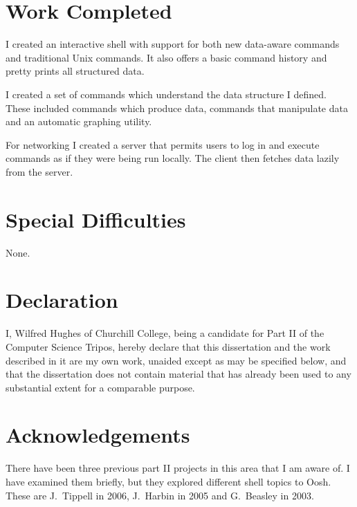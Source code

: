 \documentclass[12pt,twoside,notitlepage]{report}
\begin{document}
\section*{Work Completed}
I created an interactive shell with support for both new data-aware commands and
traditional Unix commands. It also offers a basic command history and pretty
prints all structured data.

I created a set of commands which understand the data structure I defined. These
included commands which produce data, commands that manipulate data and an
automatic graphing utility.

For networking I created a server that permits users to log in and execute
commands as if they were being run locally. The client then fetches data lazily
from the server.

\section*{Special Difficulties}
None.
 
\newpage
\section*{Declaration}

I, Wilfred Hughes of Churchill College, being a candidate for Part II
of the Computer Science Tripos, hereby declare that this dissertation
and the work described in it are my own work, unaided except as may be
specified below, and that the dissertation does not contain material
that has already been used to any substantial extent for a comparable
purpose.

\bigskip
{}

\medskip
{}

\cleardoublepage

\tableofcontents

\listoffigures

\newpage
\section*{Acknowledgements}

There have been three previous part II projects in this area that I am
aware of. I have examined them briefly, but they explored different
shell topics to Oosh. These are J.\ Tippell in 2006, J.\ Harbin in
2005 and G.\ Beasley in 2003.
\end{document}
